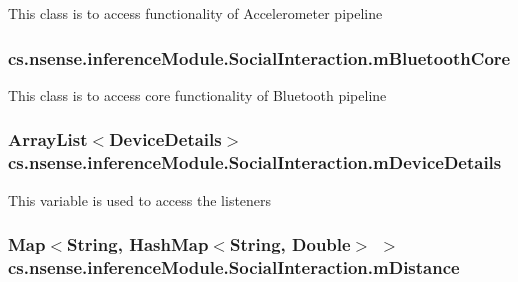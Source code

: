 This class is to access functionality of Accelerometer pipeline \hypertarget{classcs_1_1nsense_1_1inference_module_1_1_social_interaction_a8738fb102c15b3e5743b011ada07ccd5}{
\subsubsection[{m\-Bluetooth\-Core}]{ cs.\-nsense.\-inference\-Module.\-Social\-Interaction.\-m\-Bluetooth\-Core\hspace{0.3cm}{\ttfamily [private]}}}\label{classcs_1_1nsense_1_1inference_module_1_1_social_interaction_a8738fb102c15b3e5743b011ada07ccd5}
This class is to access core functionality of Bluetooth pipeline \hypertarget{classcs_1_1nsense_1_1inference_module_1_1_social_interaction_ab82b4e9c6391569e21909ba53a99a402}{
\subsubsection[{m\-Device\-Details}]{\setlength{\rightskip}{0pt plus 5cm}Array\-List$<${\bf Device\-Details}$>$ cs.\-nsense.\-inference\-Module.\-Social\-Interaction.\-m\-Device\-Details\hspace{0.3cm}{\ttfamily [static]}}}\label{classcs_1_1nsense_1_1inference_module_1_1_social_interaction_ab82b4e9c6391569e21909ba53a99a402}
This variable is used to access the listeners \hypertarget{classcs_1_1nsense_1_1inference_module_1_1_social_interaction_a9fa08ba745e09be222794b6699ef5e9c}{
\subsubsection[{m\-Distance}]{\setlength{\rightskip}{0pt plus 5cm}Map$<$String, Hash\-Map$<$String, Double$>$ $>$ cs.\-nsense.\-inference\-Module.\-Social\-Interaction.\-m\-Distance\hspace{0.3cm}{\ttfamily [static]}}}\label{classcs_1_1nsense_1_1inference_module_1_1_social_interaction_a9fa08ba745e09be222794b6699ef5e9c}
